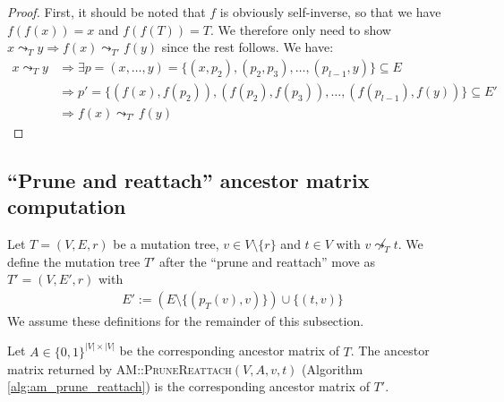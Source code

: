 \begin{proof}
    First, it should be noted that $f$ is obviously self-inverse, so that we have $f(f(x)) = x$ and $f(f(T)) = T$. We therefore only need to show $x \leadsto_{T} y \Rightarrow f(x) \leadsto_{T'} f(y)$ since the rest follows. We have:
    \begin{align*}
        x \leadsto_T y &\Rightarrow \exists p = (x, \dots, y) = \{(x, p_2), (p_2, p_3), \dots, (p_{l-1}, y)\} \subseteq E \\
        &\Rightarrow p' = \{(f(x), f(p_2)), (f(p_2), f(p_3)), \dots, (f(p_{l-1}), f(y))\} \subseteq E' \\
        &\Rightarrow f(x) \leadsto_{T'} f(y)
    \end{align*}
\end{proof}

\subsection{``Prune and reattach'' ancestor matrix computation}

\begin{definition}
    \label{def:prune_and_reattach}
    Let $T = (V, E, r)$ be a mutation tree, $v \in V \setminus \{r\}$ and $t \in V$ with $v \not\leadsto_T t$. We define the mutation tree $T'$ after the ``prune and reattach'' move as $T' = (V, E', r)$ with
    \begin{align*}
        E' := (E \setminus \{(p_T(v), v)\}) \cup \{(t, v)\}
    \end{align*}
    We assume these definitions for the remainder of this subsection.
\end{definition}

\begin{theorem}
    \label{theo:prune_reattach_correctness}
    Let $A \in \{0,1\}^{|V| \times |V|}$ be the corresponding ancestor matrix of $T$. The ancestor matrix returned by \textsc{AM::Prune\-Reattach}\-$(V, A, v, t)$ (Algorithm \ref{alg:am_prune_reattach}) is the corresponding ancestor matrix of $T'$.
\end{theorem}

